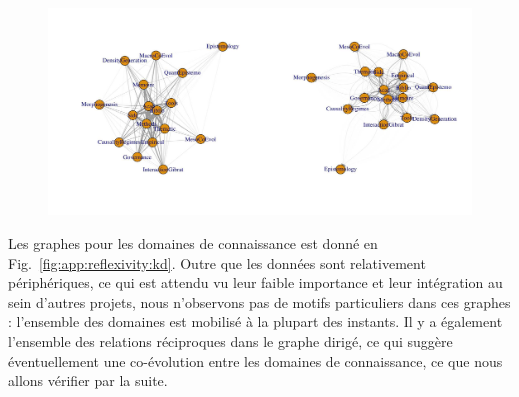 \begin{figure}
	\includegraphics[width=\linewidth]{Figures/Final/F-reflexivity-projects.jpg}
\end{figure}


Les graphes pour les domaines de connaissance est donné en Fig.~\ref{fig:app:reflexivity:kd}. Outre que les données sont relativement périphériques, ce qui est attendu vu leur faible importance et leur intégration au sein d'autres projets, nous n'observons pas de motifs particuliers dans ces graphes : l'ensemble des domaines est mobilisé à la plupart des instants. Il y a également l'ensemble des relations réciproques dans le graphe dirigé, ce qui suggère éventuellement une co-évolution entre les domaines de connaissance, ce que nous allons vérifier par la suite.

